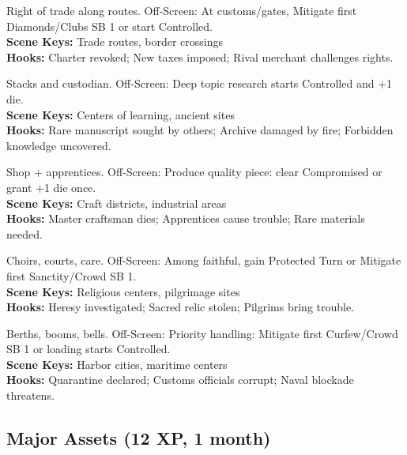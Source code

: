 \documentclass[12pt]{article}
\begin{document}
\begin{description}[leftmargin=*]
  \item[\textbf{Trading Charter}] Right of trade along routes. Off-Screen: At customs/gates, Mitigate first Diamonds/Clubs SB 1 or start Controlled. \\
  \textbf{Scene Keys:} Trade routes, border crossings \\
  \textbf{Hooks:} Charter revoked; New taxes imposed; Rival merchant challenges rights.

  \item[\textbf{Library Archive}] Stacks and custodian. Off-Screen: Deep topic research starts Controlled and +1 die. \\
  \textbf{Scene Keys:} Centers of learning, ancient sites \\
  \textbf{Hooks:} Rare manuscript sought by others; Archive damaged by fire; Forbidden knowledge uncovered.

  \item[\textbf{Craftsman's Quarter}] Shop + apprentices. Off-Screen: Produce quality piece: clear Compromised or grant +1 die once. \\
  \textbf{Scene Keys:} Craft districts, industrial areas \\
  \textbf{Hooks:} Master craftsman dies; Apprentices cause trouble; Rare materials needed.

  \item[\textbf{Temple Complex}] Choirs, courts, care. Off-Screen: Among faithful, gain Protected Turn or Mitigate first Sanctity/Crowd SB 1. \\
  \textbf{Scene Keys:} Religious centers, pilgrimage sites \\
  \textbf{Hooks:} Heresy investigated; Sacred relic stolen; Pilgrims bring trouble.

  \item[\textbf{Port Authority}] Berths, booms, bells. Off-Screen: Priority handling: Mitigate first Curfew/Crowd SB 1 or loading starts Controlled. \\
  \textbf{Scene Keys:} Harbor cities, maritime centers \\
  \textbf{Hooks:} Quarantine declared; Customs officials corrupt; Naval blockade threatens.
\end{description}

\subsection*{Major Assets (12 XP, 1 month)}
\end{document}
